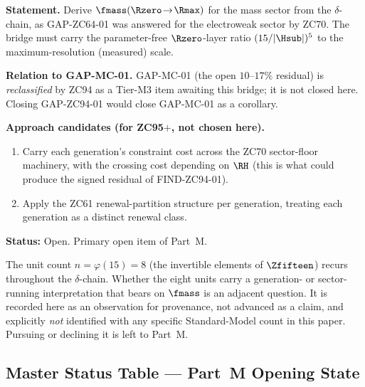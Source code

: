 \documentclass[12pt, a4paper]{article}
\begin{document}
\begin{openqbox}[title={GAP-ZC94-01: The Mass-Sector Running Bridge
  (Priority 1 --- the Part~M frontier)}]
\textbf{Statement.} Derive $\fmass(\Rzero\!\to\!\Rmax)$ for the mass sector
from the $\delta$-chain, as GAP-ZC64-01 was answered for the electroweak sector
by ZC70. The bridge must carry the parameter-free $\Rzero$-layer ratio
$(15/|\Hsub|)^5$ to the maximum-resolution (measured) scale.

\textbf{Relation to GAP-MC-01.} GAP-MC-01 (the open $10$--$17\%$ residual) is
\emph{reclassified} by ZC94 as a Tier-M3 item awaiting this bridge; it is not
closed here. Closing GAP-ZC94-01 would close GAP-MC-01 as a corollary.

\textbf{Approach candidates (for ZC95$+$, not chosen here).}
\begin{enumerate}[leftmargin=1.8em, noitemsep]
  \item Carry each generation's constraint cost across the ZC70 sector-floor
    machinery, with the crossing cost depending on $\RH$ (this is what could
    produce the signed residual of FIND-ZC94-01).
  \item Apply the ZC61 renewal-partition structure per generation, treating
    each generation as a distinct renewal class.
\end{enumerate}
\textbf{Status:} Open. Primary open item of Part~M.
\end{openqbox}

\begin{openqbox}[title={OBS-ZC94-01: An Adjacent Frontier, Noted Not Claimed}]
The unit count $n=\varphi(15)=8$ (the invertible elements of $\Zfifteen$)
recurs throughout the $\delta$-chain. Whether the eight units carry a
generation- or sector-running interpretation that bears on $\fmass$ is an
adjacent question. It is recorded here as an observation for provenance, not
advanced as a claim, and explicitly \emph{not} identified with any specific
Standard-Model count in this paper. Pursuing or declining it is left to Part~M.
\end{openqbox}

\subsection{Master Status Table --- Part~M Opening State}
\end{document}
